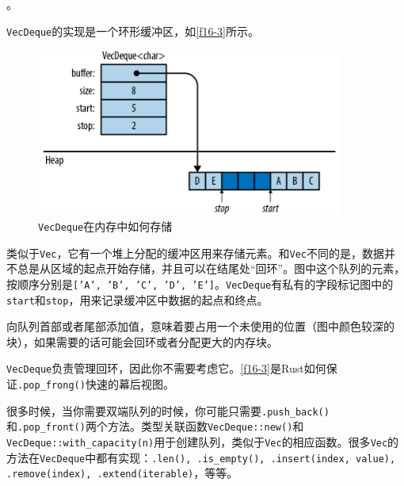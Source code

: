 

。

\texttt{VecDeque}的实现是一个环形缓冲区，如\autoref{f16-3}所示。

\begin{figure}[htbp]
    \centering
    \includegraphics[width=0.9\textwidth]{../img/f16-3.png}
    \caption{\texttt{VecDeque}在内存中如何存储}
    \label{f16-3}
\end{figure}

类似于\texttt{Vec}，它有一个堆上分配的缓冲区用来存储元素。和\texttt{Vec}不同的是，数据并不总是从区域的起点开始存储，并且可以在结尾处“回环”。图中这个队列的元素，按顺序分别是\texttt{['A', 'B', 'C', 'D', 'E']}。\texttt{VecDeque}有私有的字段标记图中的\texttt{start}和\texttt{stop}，用来记录缓冲区中数据的起点和终点。

向队列首部或者尾部添加值，意味着要占用一个未使用的位置（图中颜色较深的块），如果需要的话可能会回环或者分配更大的内存块。

\texttt{VecDeque}负责管理回环，因此你不需要考虑它。\autoref{f16-3}是Rust如何保证\texttt{.pop\_frong()}快速的幕后视图。

很多时候，当你需要双端队列的时候，你可能只需要\texttt{.push\_back()}和\texttt{.pop\_front()}两个方法。类型关联函数\texttt{VecDeque::new()}和\texttt{VecDeque::with\_capacity(n)}用于创建队列，类似于\texttt{Vec}的相应函数。很多\texttt{Vec}的方法在\texttt{VecDeque}中都有实现：\texttt{.len(), .is\_empty(), .insert(index, value), .remove(index), .extend(iterable)}，等等。

